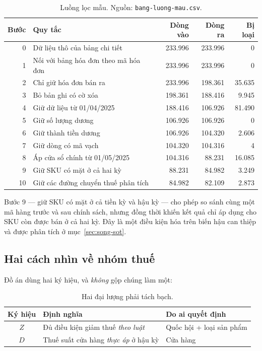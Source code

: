 \documentclass[11pt]{article}
\begin{document}
\begin{table}[htbp]
  \centering
  \caption{Luồng lọc mẫu. Nguồn: \texttt{bang-luong-mau.csv}.}
  \label{tab:luong-mau}
  \begin{tabular}{rlrrr}
    \toprule
    Bước & Quy tắc & Dòng vào & Dòng ra & Bị loại \\
    \midrule
    0  & Dữ liệu thô của bảng chi tiết        & 233.996 & 233.996 & 0 \\
    1  & Nối với bảng hóa đơn theo mã hóa đơn & 233.996 & 233.996 & 0 \\
    2  & Chỉ giữ hóa đơn bán ra               & 233.996 & 198.361 & 35.635 \\
    3  & Bỏ bản ghi có cờ xóa                 & 198.361 & 188.416 & 9.945 \\
    4  & Giữ dữ liệu từ 01/04/2025            & 188.416 & 106.926 & 81.490 \\
    5  & Giữ số lượng dương                   & 106.926 & 106.926 & 0 \\
    6  & Giữ thành tiền dương                 & 106.926 & 104.320 & 2.606 \\
    7  & Giữ dòng có mã vạch                  & 104.320 & 104.316 & 4 \\
    8  & Áp cửa sổ chính từ 01/05/2025        & 104.316 & 88.231  & 16.085 \\
    9  & Giữ SKU có mặt ở cả hai kỳ           & 88.231  & 84.982  & 3.249 \\
    10 & Giữ các đường chuyển thuế phân tích  & 84.982  & 82.109  & 2.873 \\
    \bottomrule
  \end{tabular}
\end{table}

Bước 9 --- giữ SKU có mặt ở cả tiền kỳ và hậu kỳ --- cho phép so sánh cùng một mã hàng trước và
sau chính sách, nhưng đồng thời khiến kết quả chỉ áp dụng cho SKU còn được bán ở cả hai kỳ. Đây là
một điều kiện hóa trên biến hậu can thiệp và được phân tích ở mục~\ref{sec:song-sot}.

\subsection{Hai cách nhìn về nhóm thuế}
\label{sec:z-va-d}

Đồ án dùng hai ký hiệu, và \emph{không} gộp chúng làm một:

\begin{table}[htbp]
  \centering
  \caption{Hai đại lượng phải tách bạch.}
  \label{tab:z-d}
  \begin{tabular}{cll}
    \toprule
    Ký hiệu & Định nghĩa & Do ai quyết định \\
    \midrule
    $Z$ & Đủ điều kiện giảm thuế \emph{theo luật}       & Quốc hội + loại sản phẩm \\
    $D$ & Thuế suất cửa hàng \emph{thực áp} ở hậu kỳ    & Cửa hàng \\
    \bottomrule
  \end{tabular}
\end{table}
\end{document}
